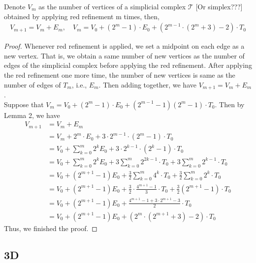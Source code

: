     \begin{lemma}
    Denote $V_{m}$ as the number of vertices of a simplicial complex $\mathcal{T}$ [Or simplex???] obtained by applying red refinement m times, then,
    \begin{align*}
    V_{m+1} = V_{m} + E_{m}, \quad V_m = V_0 + (2^m -1)\cdot E_0 + (2^{m-1}\cdot(2^m+3)-2)\cdot T_0
    \end{align*}
    \end{lemma}
    \begin{proof}
    Whenever red refinement is applied, we set a midpoint on each edge as a new vertex. That is, we obtain a same number of new vertices as the number of edges of the simplicial complex before applying the red refinement. After applying the red refinement one more time, the number of new vertices is same as the number of edges of $T_m$, i.e., $E_m$. Then adding together, we have $V_{m+1} = V_m + E_m$.\\
    Suppose that $V_m = V_0 + (2^m -1)\cdot E_0 + (2^{m-1} -1)(2^m -1)\cdot T_0$. Then by Lemma 2, we have
    \begin{align*}
    V_{m+1} &= V_m + E_m\\
    &= V_m + 2^m\cdot E_0 + 3\cdot 2^{m-1}\cdot(2^m-1)\cdot T_0\\
    &= V_0 + \sum_{k=0}^m 2^k E_0 + 3\cdot 2^{k-1}\cdot(2^k-1)\cdot T_0\\
    &= V_0 + \sum_{k=0}^m 2^k E_0 + 3\sum_{k=0}^m 2^{2k-1}\cdot T_0 + 3\sum_{k=0}^m 2^{k-1}\cdot T_0\\
    &= V_0 + (2^{m+1}-1)E_0 + \frac{3}{2}\sum_{k=0}^m 4^k\cdot T_0 + \frac{3}{2}\sum_{k=0}^m 2^k\cdot T_0\\
    &= V_0 + (2^{m+1}-1)E_0 + \frac{3}{2}\cdot\frac{4^{m+1}-1}{3}\cdot T_0 + \frac{3}{2}(2^{m+1}-1)\cdot T_0\\
    &= V_0 + (2^{m+1}-1)E_0 + \frac{4^{m+1}-1 + 3\cdot2^{m+1} -3}{2}\cdot T_0\\
    &= V_0 + (2^{m+1}-1)E_0 + (2^m\cdot(2^{m+1}+3)-2)\cdot T_0
    \end{align*}
    Thus, we finished the proof.
    \end{proof}


    \subsection{3D}